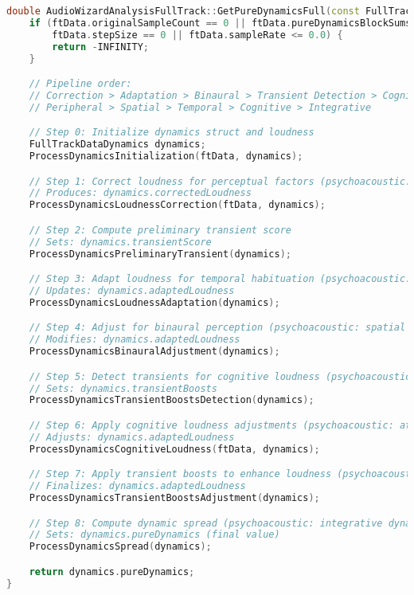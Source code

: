 \documentclass[11pt]{article}
\begin{document}
\begin{lstlisting}[language=C++]
double AudioWizardAnalysisFullTrack::GetPureDynamicsFull(const FullTrackData& ftData) {
	if (ftData.originalSampleCount == 0 || ftData.pureDynamicsBlockSums.size() == 0 ||
		ftData.stepSize == 0 || ftData.sampleRate <= 0.0) {
		return -INFINITY;
	}

	// Pipeline order:
	// Correction > Adaptation > Binaural > Transient Detection > Cognitive > Transient Application > Spread mirrors auditory processing:
	// Peripheral > Spatial > Temporal > Cognitive > Integrative

	// Step 0: Initialize dynamics struct and loudness
	FullTrackDataDynamics dynamics;
	ProcessDynamicsInitialization(ftData, dynamics);

	// Step 1: Correct loudness for perceptual factors (psychoacoustic: Zwicker model)
	// Produces: dynamics.correctedLoudness
	ProcessDynamicsLoudnessCorrection(ftData, dynamics);

	// Step 2: Compute preliminary transient score
	// Sets: dynamics.transientScore
	ProcessDynamicsPreliminaryTransient(dynamics);

	// Step 3: Adapt loudness for temporal habituation (psychoacoustic: neural adaptation)
	// Updates: dynamics.adaptedLoudness
	ProcessDynamicsLoudnessAdaptation(dynamics);

	// Step 4: Adjust for binaural perception (psychoacoustic: spatial cues)
	// Modifies: dynamics.adaptedLoudness
	ProcessDynamicsBinauralAdjustment(dynamics);

	// Step 5: Detect transients for cognitive loudness (psychoacoustic: onset salience)
	// Sets: dynamics.transientBoosts
	ProcessDynamicsTransientBoostsDetection(dynamics);

	// Step 6: Apply cognitive loudness adjustments (psychoacoustic: attention, genre weighting)
	// Adjusts: dynamics.adaptedLoudness
	ProcessDynamicsCognitiveLoudness(ftData, dynamics);

	// Step 7: Apply transient boosts to enhance loudness (psychoacoustic: transient amplification)
	// Finalizes: dynamics.adaptedLoudness
	ProcessDynamicsTransientBoostsAdjustment(dynamics);

	// Step 8: Compute dynamic spread (psychoacoustic: integrative dynamic range)
	// Sets: dynamics.pureDynamics (final value)
	ProcessDynamicsSpread(dynamics);

	return dynamics.pureDynamics;
}
\end{lstlisting}
\end{document}
